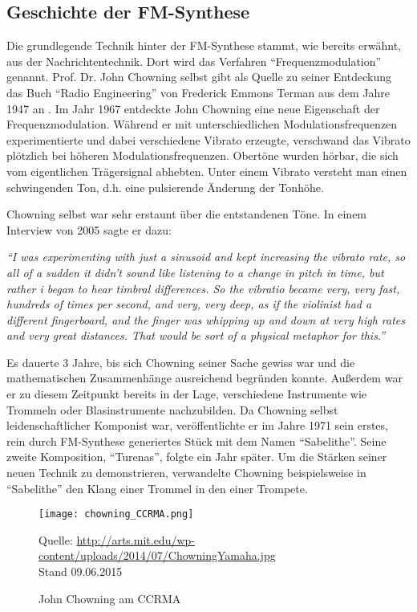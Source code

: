 \subsection{Geschichte der FM-Synthese}
\label{geschichteFMSynthese}
Die grundlegende Technik hinter der FM-Synthese stammt, wie bereits erwähnt, aus der Nachrichtentechnik. Dort wird das Verfahren ``Frequenzmodulation'' genannt. Prof. Dr. John Chowning selbst gibt als Quelle zu seiner Entdeckung das Buch ``Radio Engineering'' von Frederick Emmons Terman aus dem Jahre 1947 an \cite[S. 35]{soundofinnovation}. Im Jahr 1967 entdeckte John Chowning eine neue Eigenschaft der Frequenzmodulation. Während er mit unterschiedlichen Modulationsfrequenzen experimentierte und dabei verschiedene Vibrato erzeugte, verschwand das Vibrato plötzlich bei höheren Modulationsfrequenzen. Obertöne wurden hörbar, die sich vom eigentlichen Trägersignal abhebten. Unter einem Vibrato versteht man einen schwingenden Ton, d.h. eine pulsierende Änderung der Tonhöhe.\cite{fatherofdigitalmusik}

Chowning selbst war sehr erstaunt über die entstandenen Töne. In einem Interview von 2005 sagte er dazu: 

\textit{``I was experimenting with just a sinusoid and kept increasing the vibrato rate, so all of a sudden it didn't sound like listening to a change in pitch in time, but rather i began to hear timbral differences. So the vibratio became very, very fast, hundreds of times per second, and very, very deep, as if the violinist had a different fingerboard, and the finger was whipping up and down at very high rates and very great distances. That would be sort of a physical metaphor for this.''}\cite[S. 34f.]{soundofinnovation}

Es dauerte 3 Jahre, bis sich Chowning seiner Sache gewiss war und die mathematischen Zusammenhänge ausreichend begründen konnte. Außerdem war er zu diesem Zeitpunkt bereits in der Lage, verschiedene Instrumente wie Trommeln oder Blasinstrumente nachzubilden. Da Chowning selbst leidenschaftlicher Komponist war, veröffentlichte er im Jahre 1971 sein erstes, rein durch FM-Synthese generiertes Stück mit dem Namen ``Sabelithe''. Seine zweite Komposition, ``Turenas'', folgte ein Jahr später.
Um die Stärken seiner neuen Technik zu demonstrieren, verwandelte Chowning beispielsweise in ``Sabelithe'' den Klang einer Trommel in den einer Trompete.\cite[S. 39]{soundofinnovation}
 
\begin{figure} [ht]
\centering
  \texttt{[image: chowning\_CCRMA.png]}
\caption{John Chowning am CCRMA}
\label{fig:chowningdx7}
Quelle: \url{ http://arts.mit.edu/wp-content/uploads/2014/07/ChowningYamaha.jpg} \\Stand 09.06.2015
\end{figure}
 
